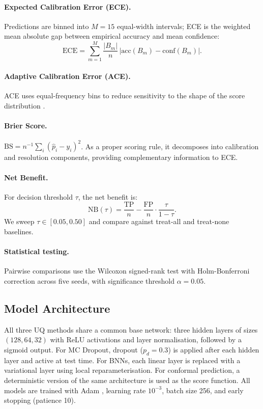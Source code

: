 \documentclass[11pt,a4paper]{article}
\newcommand{\hatP}{\hat{p}}
\newcommand{\ECE}{\mathrm{ECE}}
\newcommand{\BS}{\mathrm{BS}}
\newcommand{\NB}{\mathrm{NB}}
\begin{document}
\paragraph{Expected Calibration Error (ECE).} Predictions are binned into $M=15$ equal-width intervals; ECE is the weighted mean absolute gap between empirical accuracy and mean confidence:
\begin{equation}
  \ECE = \sum_{m=1}^M \frac{|B_m|}{n}\,|\mathrm{acc}(B_m) - \mathrm{conf}(B_m)|.
\end{equation}

\paragraph{Adaptive Calibration Error (ACE).} ACE uses equal-frequency bins to reduce sensitivity to the shape of the score distribution \citep{nixon2019}.

\paragraph{Brier Score.} $\BS = n^{-1}\sum_i(\hatP_i - y_i)^2$. As a proper scoring rule, it decomposes into calibration and resolution components, providing complementary information to ECE.

\paragraph{Net Benefit.} For decision threshold $\tau$, the net benefit is:
\begin{equation}
  \NB(\tau) = \frac{\mathrm{TP}}{n} - \frac{\mathrm{FP}}{n}\cdot\frac{\tau}{1-\tau}.
\end{equation}
We sweep $\tau \in [0.05, 0.50]$ and compare against treat-all and treat-none baselines.

\paragraph{Statistical testing.} Pairwise comparisons use the Wilcoxon signed-rank test with Holm-Bonferroni correction across five seeds, with significance threshold $\alpha = 0.05$.

\subsection{Model Architecture}

All three UQ methods share a common base network: three hidden layers of sizes $(128, 64, 32)$ with ReLU activations and layer normalisation, followed by a sigmoid output. For MC Dropout, dropout ($p_d=0.3$) is applied after each hidden layer and active at test time. For BNNs, each linear layer is replaced with a variational layer using local reparameterisation. For conformal prediction, a deterministic version of the same architecture is used as the score function. All models are trained with Adam \citep{kingma2014adam}, learning rate $10^{-3}$, batch size 256, and early stopping (patience 10).
\end{document}

